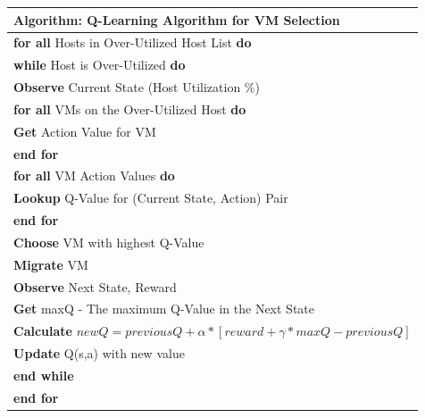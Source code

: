 \documentclass[a4paper,12pt]{Classes/RoboticsLaTeX}
\begin{document}
    \begin{center}
    \begin{tabular}{|l|}
    \hline
    \textbf{Algorithm: Q-Learning Algorithm for VM Selection} \\
    \hline
    \textbf{for all} Hosts in Over-Utilized Host List \textbf{do} \\
    \hspace{1em} \textbf{while} Host is Over-Utilized \textbf{do} \\
    \hspace{2em} \textbf{Observe} Current State (Host Utilization \%)\\
    \hspace{2em} \textbf{for all} VMs on the Over-Utilized Host \textbf{do} \\
    \hspace{3em} \textbf{Get} Action Value for VM \\
    \hspace{2em} \textbf{end for} \\
    \hspace{2em} \textbf{for all} VM Action Values \textbf{do} \\
    \hspace{3em} \textbf{Lookup} Q-Value for (Current State, Action) Pair \\
    \hspace{2em} \textbf{end for} \\
    \hspace{2em} \textbf{Choose} VM with highest Q-Value \\
    \hspace{2em} \textbf{Migrate} VM \\
    \hspace{2em} \textbf{Observe} Next State, Reward \\
    \hspace{2em} \textbf{Get} maxQ - The maximum Q-Value in the Next State \\
    \hspace{2em} \textbf{Calculate} $newQ = previousQ + \alpha * [reward + \gamma * maxQ - previousQ]$ \\
    \hspace{2em} \textbf{Update} Q(s,a) with new value \\
    \hspace{1em} \textbf{end while} \\
    \textbf{end for} \\
    \hline
    \end{tabular}
    \end{center}
\end{document}
